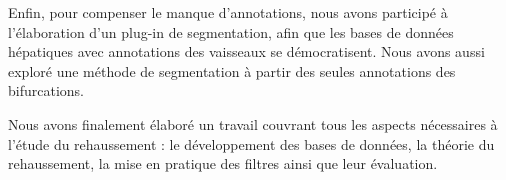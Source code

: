 Enfin, pour compenser le manque d'annotations, nous avons participé à l'élaboration d'un plug-in de segmentation, afin que les bases de données hépatiques avec annotations des vaisseaux se démocratisent. Nous avons aussi exploré une méthode de segmentation à partir des seules annotations des bifurcations.

Nous avons finalement élaboré un travail couvrant tous les aspects nécessaires à l'étude du rehaussement : le développement des bases de données, la théorie du rehaussement, la mise en pratique des filtres ainsi que leur évaluation.